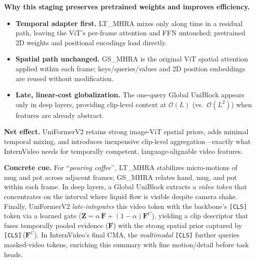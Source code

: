 \begin{enrichment}
\begin{enrichment}
        \textbf{Why this staging preserves pretrained weights and improves efficiency.}
        \begin{itemize}
            \item \textbf{Temporal adapter first.} LT\_MHRA mixes only along time in a residual path, leaving the ViT’s per-frame attention and FFN untouched; pretrained 2D weights and positional encodings load directly. 
            \item \textbf{Spatial path unchanged.} GS\_MHRA is the original ViT spatial attention applied within each frame; keys/queries/values and 2D position embeddings are reused without modification. 
            \item \textbf{Late, linear-cost globalization.} The one-query Global UniBlock appears only in deep layers, providing clip-level context at \(\mathcal{O}(L)\) (vs.\ \(\mathcal{O}(L^2)\)) when features are already abstract. 
        \end{itemize}
        
        \noindent
        \textbf{Net effect.} UniFormerV2 retains strong image-ViT spatial priors, adds minimal temporal mixing, and introduces inexpensive clip-level aggregation—exactly what InternVideo needs for temporally competent, language-alignable video features.
        
        \textbf{Concrete cue.} For ``\emph{pouring coffee}’’, LT\_MHRA stabilizes micro-motions of mug and pot across adjacent frames; GS\_MHRA relates hand, mug, and pot within each frame. In deep layers, a Global UniBlock extracts a \emph{video token} that concentrates on the interval where liquid flow is visible despite camera shake. Finally, UniFormerV2 \emph{late-integrates} this video token with the backbone’s \texttt{[CLS]} token via a learned gate (\(\bm{Z}=\alpha\,\bm{F}+(1{-}\alpha)\bm{F}^{C}\)), yielding a clip descriptor that fuses temporally pooled evidence (\(\bm{F}\)) with the strong spatial prior captured by \texttt{[CLS]}\,(\(\bm{F}^{C}\)). In InternVideo’s final CMA, the \emph{multimodal} \texttt{[CLS]} further queries masked-video tokens, enriching this summary with fine motion/detail before task heads.
        

\end{enrichment}
\end{enrichment}
